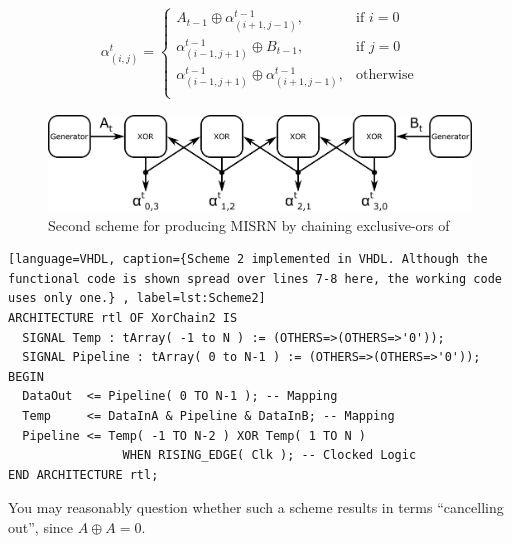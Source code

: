 \documentclass{article}
\newcommand{\xor}{\oplus}
\begin{document}
\begin{align}
\alpha^t_{(i,j)} = 
\begin{cases}
A_{t-1} \xor \alpha^{t-1}_{(i+1,j-1)}, & \text{if $i=0$}\\
\alpha^{t-1}_{(i-1,j+1)} \xor B_{t-1}, & \text{if $j=0$}\\
\alpha^{t-1}_{(i-1,j+1)} \xor \alpha^{t-1}_{(i+1,j-1)}, & \text{otherwise}\\
\end{cases}
\end{align}

\begin{figure}[ht]
\centering
\includegraphics[width=\textwidth]{MISRN2.png}
\caption{Second scheme for producing MISRN by chaining exclusive-ors of }
\label{fig:scheme2}
\end{figure}

\begin{minipage}{1.0\textwidth}
\centering
\begin{lstlisting}[language=VHDL, caption={Scheme 2 implemented in VHDL. Although the functional code is shown spread over lines 7-8 here, the working code uses only one.} , label=lst:Scheme2]
ARCHITECTURE rtl OF XorChain2 IS
  SIGNAL Temp : tArray( -1 to N ) := (OTHERS=>(OTHERS=>'0'));
  SIGNAL Pipeline : tArray( 0 to N-1 ) := (OTHERS=>(OTHERS=>'0'));
BEGIN
  DataOut  <= Pipeline( 0 TO N-1 ); -- Mapping
  Temp     <= DataInA & Pipeline & DataInB; -- Mapping
  Pipeline <= Temp( -1 TO N-2 ) XOR Temp( 1 TO N )
                WHEN RISING_EDGE( Clk ); -- Clocked Logic
END ARCHITECTURE rtl;
\end{lstlisting}
\end{minipage}

You may reasonably question whether such a scheme results in terms ``cancelling out'', since $A \xor A = 0$.  
\end{document}
